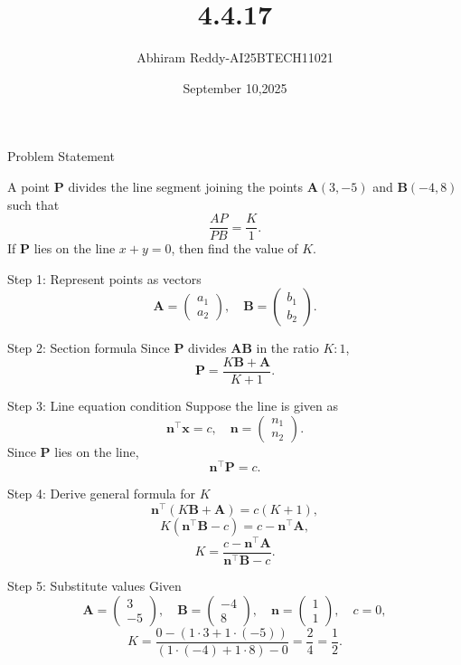 \documentclass{beamer}
\title 
{4.4.17}
\date{September 10,2025}
\author 
{Abhiram Reddy-AI25BTECH11021}
\begin{document}
\frame{\titlepage}
\begin{frame}{Problem Statement}

A point \(\mathbf{P}\) divides the line segment joining the points \(\mathbf{A}(3, -5)\) and \(\mathbf{B}(-4, 8)\) such that 
\[
\frac{AP}{PB} = \frac{K}{1}.
\]
If \(\mathbf{P}\) lies on the line \(x + y = 0\), then find the value of \(K\).
\end{frame}

\begin{frame}{Step 1: Represent points as vectors}
\[
\mathbf{A} = \begin{pmatrix} a_1 \\ a_2 \end{pmatrix}, \quad 
\mathbf{B} = \begin{pmatrix} b_1 \\ b_2 \end{pmatrix}.
\]
\end{frame}

\begin{frame}{Step 2: Section formula}
Since \(\mathbf{P}\) divides \(\mathbf{AB}\) in the ratio \(K : 1\),
\[
\mathbf{P} = \frac{K \mathbf{B} + \mathbf{A}}{K + 1}.
\]
\end{frame}

\begin{frame}{Step 3: Line equation condition}
Suppose the line is given as
\[
\mathbf{n}^\top \mathbf{x} = c, 
\quad \mathbf{n} = \begin{pmatrix} n_1 \\ n_2 \end{pmatrix}.
\]
Since \(\mathbf{P}\) lies on the line,
\[
\mathbf{n}^\top \mathbf{P} = c.
\]
\end{frame}

\begin{frame}{Step 4: Derive general formula for \(K\)}
\[
\mathbf{n}^\top (K\mathbf{B} + \mathbf{A}) = c(K+1),
\]
\[
K(\mathbf{n}^\top \mathbf{B} - c) = c - \mathbf{n}^\top \mathbf{A},
\]
\[
K = \frac{c - \mathbf{n}^\top \mathbf{A}}{\mathbf{n}^\top \mathbf{B} - c}.
\]
\end{frame}

\begin{frame}{Step 5: Substitute values}
Given
\[
\mathbf{A} = \begin{pmatrix} 3 \\ -5 \end{pmatrix}, \quad 
\mathbf{B} = \begin{pmatrix} -4 \\ 8 \end{pmatrix}, \quad 
\mathbf{n} = \begin{pmatrix} 1 \\ 1 \end{pmatrix}, \quad 
c = 0,
\]
\[
K = \frac{0 - (1\cdot 3 + 1\cdot (-5))}{(1\cdot (-4) + 1\cdot 8) - 0}
= \frac{2}{4}
= \frac{1}{2}.
\]
\end{frame}
\end{document}
